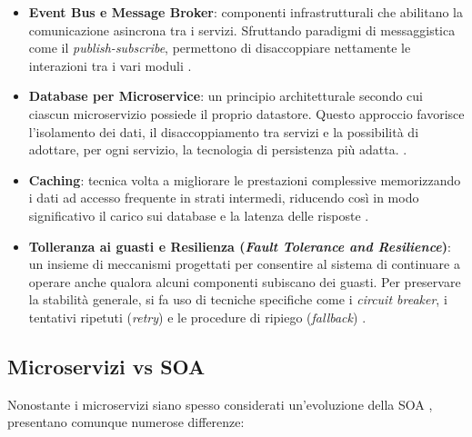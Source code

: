 \begin{itemize}
    \item \textbf{Event Bus e Message Broker}: componenti infrastrutturali che abilitano la comunicazione asincrona tra i servizi. Sfruttando paradigmi di messaggistica come il \textit{publish-subscribe}, permettono di disaccoppiare nettamente le interazioni tra i vari moduli \cite{gfg_microservices}.

    \item \textbf{Database per Microservice}: un principio architetturale secondo cui ciascun microservizio possiede il proprio datastore. Questo approccio favorisce l’isolamento dei dati, il disaccoppiamento tra servizi e la possibilità di adottare, per ogni servizio, la tecnologia di persistenza più adatta. \cite{gfg_microservices, Richardson2018, Dragoni2017}.

    \item \textbf{Caching}: tecnica volta a migliorare le prestazioni complessive memorizzando i dati ad accesso frequente in strati intermedi, riducendo così in modo significativo il carico sui database e la latenza delle risposte \cite{gfg_microservices}.

    \item \textbf{Tolleranza ai guasti e Resilienza (\textit{Fault Tolerance and Resilience})}: un insieme di meccanismi progettati per consentire al sistema di continuare a operare anche qualora alcuni componenti subiscano dei guasti. Per preservare la stabilità generale, si fa uso di tecniche specifiche come i \textit{circuit breaker}, i tentativi ripetuti (\textit{retry}) e le procedure di ripiego (\textit{fallback}) \cite{gfg_microservices}.
\end{itemize}


\subsection{Microservizi vs SOA}
Nonostante i microservizi siano spesso considerati un'evoluzione della SOA \cite{Dragoni2017}, presentano comunque numerose differenze:

